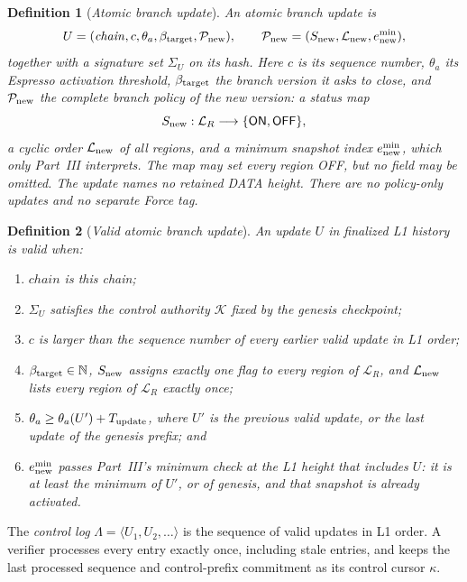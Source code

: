\documentclass[11pt,a4paper]{article}
\newcommand{\tagg}[1]{\ensuremath{\mathsf{#1}}}
\newcommand{\defterm}[1]{\textcolor{rrBlue}{\textit{#1}}}
\newtheorem{definition}{Definition}[section]
\begin{document}
\begin{definition}[\defterm{Atomic branch update}]
\label{def:control-update}
An atomic branch update is
\[
 U=(\mathit{chain},c,\theta_a,\beta_{\rm target},\mathcal P_{\rm new}),
 \qquad
 \mathcal P_{\rm new}=(S_{\rm new},\mathcal L_{\rm new},e^{\min}_{\rm new}),
\]
together with a signature set $\Sigma_U$ on its hash. Here $c$ is its
sequence number, $\theta_a$ its Espresso activation threshold,
$\beta_{\rm target}$ the branch version it asks to close, and
$\mathcal P_{\rm new}$ the complete \defterm{branch policy} of the new
version: a status map
\[
 S_{\rm new}:\mathcal L_R\longrightarrow
 \{\tagg{ON},\tagg{OFF}\},
\]
a cyclic order $\mathcal L_{\rm new}$ of all regions, and a minimum
snapshot index $e^{\min}_{\rm new}$, which only Part~III interprets. The
map may set every region OFF, but no field may be omitted. The update
names no retained DATA height. There are no policy-only updates and no
separate Force tag.
\end{definition}

\begin{definition}[\defterm{Valid atomic branch update}]
\label{def:control-valid}
An update $U$ in finalized L1 history is valid when:
\begin{enumerate}[label=(V\arabic*)]
\item $\mathit{chain}$ is this chain;
\item $\Sigma_U$ satisfies the control authority $\mathcal K$ fixed by
the genesis checkpoint;
\item $c$ is larger than the sequence number of every earlier valid
update in L1 order;
\item $\beta_{\rm target}\in\mathbb N$, $S_{\rm new}$ assigns exactly
one flag to every region of $\mathcal L_R$, and $\mathcal L_{\rm new}$
lists every region of $\mathcal L_R$ exactly once;
\item $\theta_a\ge\theta_a(U')+T_{\rm update}$, where $U'$ is the
previous valid update, or the last update of the genesis prefix; and
\item $e^{\min}_{\rm new}$ passes Part~III's minimum check at the L1
height that includes $U$: it is at least the minimum of $U'$, or of
genesis, and that snapshot is already activated.
\end{enumerate}
\end{definition}

The \defterm{control log} $\Lambda=\langle U_1,U_2,\ldots\rangle$ is the
sequence of valid updates in L1 order. A verifier processes every entry
exactly once, including stale entries, and keeps the last processed
sequence and control-prefix commitment as its control cursor $\kappa$.
\end{document}

